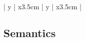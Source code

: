 \documentclass[12pt]{article}
\newcommand{\vor}{$\vee$ }
\begin{document}
\begin{longtable}{| y | x{3.5cm} | y | x{3.5cm} |}
	\end{longtable} 
	
\subsection{Semantics}
\end{document}
